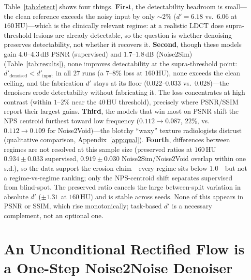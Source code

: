 \documentclass[letterpaper]{article} %
\begin{document}
Table~\ref{tab:detect} shows four things.  \textbf{First}, the detectability
headroom is small---the clean reference exceeds the noisy input by only
$\sim$2\% ($d'=6.18$ vs.\ $6.06$ at $160$\,HU)---which is the clinically relevant
regime: at a realistic LDCT dose supra-threshold lesions are already detectable,
so the question is whether denoising preserves detectability, not whether
it recovers it.  \textbf{Second}, though these models gain $4.0$--$4.3$\,dB PSNR
(supervised) and $1.7$--$1.8$\,dB (Noise2Sim) (Table~\ref{tab:results}), none
improves detectability at the supra-threshold point:
$d'_\text{denoised}<d'_\text{input}$ in all $27$ runs (a $7$--$8\%$ loss at
$160$\,HU), none exceeds the clean ceiling, and the fabrication $d'$ stays at its
floor ($0.022$--$0.033$ vs.\ $0.028$)---the denoisers erode detectability
without fabricating it.  The loss concentrates at high contrast (within
$1$--$2\%$ near the $40$\,HU threshold), precisely where PSNR/SSIM report their
largest gains.  \textbf{Third}, the models that win most on PSNR shift the NPS
centroid furthest toward low frequency ($0.112\!\to\!0.087$, $22\%$, vs.\
$0.112\!\to\!0.109$ for Noise2Void)---the blotchy ``waxy'' texture radiologists
distrust (qualitative comparison, Appendix~\ref{app:qual}).  \textbf{Fourth},
differences between regimes are not resolved at this sample size (preserved
ratios at $160$\,HU $0.934{\pm}0.033$ supervised, $0.919{\pm}0.030$
Noise2Sim/Noise2Void overlap within one s.d.), so the data support the
erosion claim---every regime sits below $1.0$---but not a regime-vs-regime
ranking; only the NPS-centroid shift separates supervised from blind-spot.  The
preserved ratio cancels the large between-split variation in absolute $d'$
($\pm1.31$ at $160$\,HU) and is stable across seeds.  None of this appears in PSNR
or SSIM, which rise monotonically; task-based $d'$ is a necessary complement, not
an optional one.

\section{An Unconditional Rectified Flow is a One-Step Noise2Noise Denoiser}
\label{sec:method}
\end{document}
